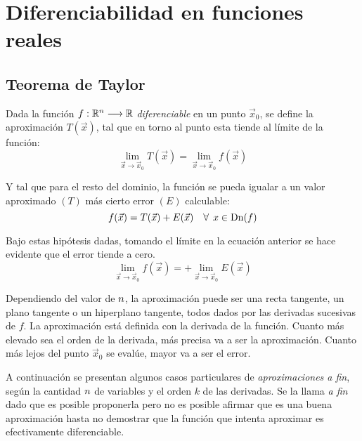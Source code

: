 \documentclass[a5paper,12pt,twoside]{book}
\begin{document}
\chapter{Diferenciabilidad en funciones reales}


\section{Teorema de Taylor}

Dada la función $f:\mathbb{R}^n \longrightarrow \mathbb{R}$ \emph{diferenciable} en un punto $\Vec{x}_0$, se define la aproximación $T(\Vec{x})$, tal que en torno al punto esta tiende al límite de la función:
\begin{equation*}
    \lim_{\Vec{x} \to \Vec{x}_0} T(\Vec{x}) = \lim_{\Vec{x} \to \Vec{x}_0} f(\Vec{x})
\end{equation*}

Y tal que para el resto del dominio, la función se pueda igualar a un valor aproximado $(T)$ más cierto error $(E)$ calculable:
\begin{equation*}
    f(\Vec{x}) = T(\Vec{x}) + E(\Vec{x}) \quad \forall \hspace{1ex} x \in \operatorname{Dn}(f)
\end{equation*}

Bajo estas hipótesis dadas, tomando el límite en la ecuación anterior se hace evidente que el error tiende a cero.
\begin{equation*}
    \lim_{\Vec{x} \to \Vec{x}_0} f(\Vec{x})
    = 
    + \lim_{\Vec{x} \to \Vec{x}_0} E(\Vec{x})
\end{equation*}

Dependiendo del valor de $n$, la aproximación puede ser una recta tangente, un plano tangente o un hiperplano tangente, todos dados por las derivadas sucesivas de $f$.
La aproximación está definida con la derivada de la función.
Cuanto más elevado sea el orden de la derivada, más precisa va a ser la aproximación.
Cuanto más lejos del punto $\Vec{x}_0$ se evalúe, mayor va a ser el error.

A continuación se presentan algunos casos particulares de \emph{aproximaciones a fin}, según la cantidad $n$ de variables y el orden $k$ de las derivadas.
Se la llama \emph{a fin} dado que es posible proponerla pero no es posible afirmar que es una buena aproximación hasta no demostrar que la función que intenta aproximar es efectivamente diferenciable.

\end{document}
